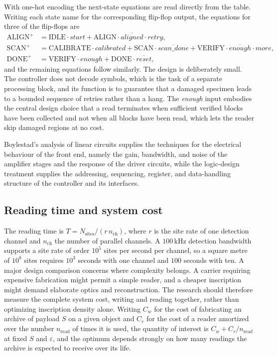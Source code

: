 With one-hot encoding the next-state equations are read directly from the table. Writing each state name for the corresponding flip-flop output, the equations for three of the flip-flops are
\begin{align*}
\mathrm{ALIGN}^{+}&=\mathrm{IDLE}\cdot\mathit{start}+\mathrm{ALIGN}\cdot\overline{\mathit{aligned}}\cdot\mathit{retry},\\
\mathrm{SCAN}^{+}&=\mathrm{CALIBRATE}\cdot\mathit{calibrated}+\mathrm{SCAN}\cdot\overline{\mathit{scan\_done}}+\mathrm{VERIFY}\cdot\overline{\mathit{enough}}\cdot\mathit{more},\\
\mathrm{DONE}^{+}&=\mathrm{VERIFY}\cdot\mathit{enough}+\mathrm{DONE}\cdot\overline{\mathit{reset}},
\end{align*}
and the remaining equations follow similarly. The design is deliberately small. The controller does not decode symbols, which is the task of a separate processing block, and its function is to guarantee that a damaged specimen leads to a bounded sequence of retries rather than a hang. The \emph{enough} input embodies the central design choice that a read terminates when sufficient verified blocks have been collected and not when all blocks have been read, which lets the reader skip damaged regions at no cost.

Boylestad's analysis of linear circuits \cite{boylestad} supplies the techniques for the electrical behaviour of the front end, namely the gain, bandwidth, and noise of the amplifier stages and the response of the driver circuits, while the logic-design treatment \cite{mano} supplies the addressing, sequencing, register, and data-handling structure of the controller and its interfaces.

\subsection{Reading time and system cost}\label{sec:time}

The reading time is $T=N_{\mathrm{sites}}/(r\,n_{\mathrm{ch}})$, where $r$ is the site rate of one detection channel and $n_{\mathrm{ch}}$ the number of parallel channels. A $100$\,kHz detection bandwidth supports a site rate of order $10^{5}$ sites per second per channel, so a square metre of $10^{8}$ sites requires $10^{3}$ seconds with one channel and $100$ seconds with ten. A major design comparison concerns where complexity belongs. A carrier requiring expensive fabrication might permit a simple reader, and a cheaper inscription might demand elaborate optics and reconstruction. The research should therefore measure the complete system cost, writing and reading together, rather than optimizing inscription density alone. Writing $C_w$ for the cost of fabricating an archive of payload $S$ on a given object and $C_r$ for the cost of a reader amortized over the number $n_{\mathrm{read}}$ of times it is used, the quantity of interest is $C_w+C_r/n_{\mathrm{read}}$ at fixed $S$ and $\varepsilon$, and the optimum depends strongly on how many readings the archive is expected to receive over its life.

